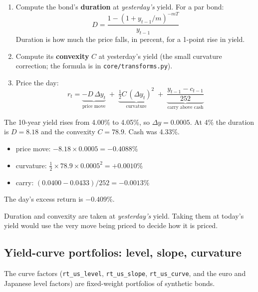 \documentclass[11pt,a4paper]{article}
\newcommand{\fid}[1]{\texttt{#1}}
\begin{document}
\begin{method}
\begin{enumerate}[leftmargin=1.4em]
  \item Compute the bond's \textbf{duration} at \emph{yesterday's} yield. For a par bond:
  \[
    D = \frac{1-(1+y_{t-1}/m)^{-mT}}{y_{t-1}}
  \]
  Duration is how much the price falls, in percent, for a 1-point rise in yield.
  \item Compute its \textbf{convexity} $C$ at yesterday's yield (the small curvature correction; the formula is in \texttt{core/transforms.py}).
  \item Price the day:
  \[
    r_t = \underbrace{-D\,\Delta y_t}_{\text{price move}} \;+\;
          \underbrace{\tfrac12 C\,(\Delta y_t)^2}_{\text{curvature}} \;+\;
          \underbrace{\frac{y_{t-1} - c_{t-1}}{252}}_{\text{carry above cash}}
  \]
\end{enumerate}
\end{method}

\begin{example}
The 10-year yield rises from 4.00\% to 4.05\%, so $\Delta y = 0.0005$. At 4\% the
duration is $D = 8.18$ and the convexity $C = 78.9$. Cash was 4.33\%.
\begin{itemize}[leftmargin=1.2em]
\item price move: $-8.18 \times 0.0005 = -0.4088\%$
\item curvature: $\tfrac12 \times 78.9 \times 0.0005^2 = +0.0010\%$
\item carry: $(0.0400 - 0.0433)/252 = -0.0013\%$
\end{itemize}
The day's excess return is $-0.409\%$.
\end{example}

\begin{tip}
Duration and convexity are taken at \emph{yesterday's} yield. Taking them at today's
yield would use the very move being priced to decide how it is priced.
\end{tip}

\subsection{Yield-curve portfolios: level, slope, curvature}

The curve factors (\fid{rt\_us\_level}, \fid{rt\_us\_slope}, \fid{rt\_us\_curve},
and the euro and Japanese level factors) are fixed-weight portfolios of synthetic
bonds.
\end{document}

